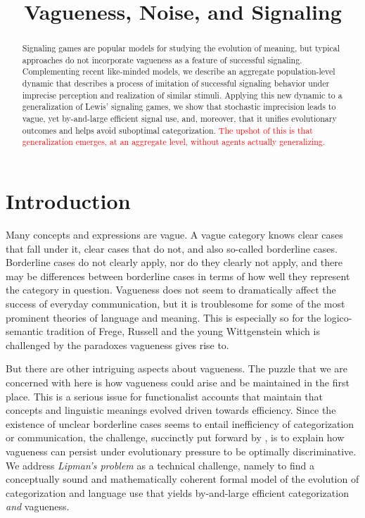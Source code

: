 \documentclass[fleqn,reqno,10pt]{article}
\title{Vagueness, Noise, and Signaling}
\date{}
\newcommand{\myred}[1]{\textcolor{red}{#1}}
\begin{document}
\maketitle

\begin{abstract}
  Signaling games are popular models for studying the evolution of meaning, but typical
  approaches do not incorporate vagueness as a feature of successful signaling.  Complementing
  recent like-minded models, we describe an aggregate population-level dynamic that describes a
  process of imitation of successful signaling behavior under imprecise perception and
  realization of similar stimuli. Applying this new dynamic to a generalization of Lewis'
  signaling games, we show that stochastic imprecision leads to vague, yet by-and-large
  efficient signal use, and, moreover, that it unifies evolutionary outcomes and helps avoid
  suboptimal categorization. \myred{The upshot of this is that generalization emerges, at an
    aggregate level, without agents actually generalizing.}
\end{abstract}

\section{Introduction}
\label{sec:introduction}

Many concepts and expressions are vague. A vague category knows clear
cases that fall under it, clear cases that do not, and also so-called
borderline cases. Borderline cases do not clearly apply, nor do they
clearly not apply, and there may be differences between borderline
cases in terms of how well they represent the category in
question. Vagueness does not seem to dramatically affect the success
of everyday communication, but it is troublesome for some of the most
prominent theories of language and meaning. This is especially so for the logico-semantic tradition of Frege, Russell and the young
Wittgenstein which is challenged by the paradoxes vagueness gives rise
to. 

But there are other intriguing aspects about vagueness. The puzzle
that we are concerned with here is how vagueness could arise and be
maintained in the first place. This is a serious issue for
functionalist accounts that maintain that concepts and linguistic
meanings evolved driven towards efficiency. Since the existence of
unclear borderline cases seems to entail inefficiency of
categorization or communication, the challenge, succinctly put forward
by \citet{Lipman2009:Why-is-Language}, is to explain how vagueness can
persist under evolutionary pressure to be optimally discriminative. We
address \emph{Lipman's problem} as a technical challenge, namely to
find a conceptually sound and mathematically coherent formal model of
the evolution of categorization and language use that yields
by-and-large efficient categorization \emph{and} vagueness.
\end{document}
